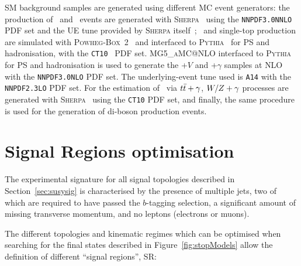 			\ac{SM} background samples are generated using different \ac{MC} event generators: the production of \Zjets\ and \Wjets\ events are generated with \textsc{Sherpa}~\cite{Sherpa} using the \verb+NNPDF3.0NNLO+~\cite{PDFs} \ac{PDF} set and the \ac{UE} tune provided by \textsc{Sherpa} itself~\cite{Sherpa}; \ttbar\ and single-top production are simulated with \textsc{Powheg-Box}~2~\cite{powheg-box} and interfaced to \textsc{Pythia}~\cite{Pythia2006} for \ac{PS} and hadronisation, with the \verb+CT10+~\cite{CT10} \ac{PDF} set. {\scshape MG5\_aMC\/@NLO} interfaced to \textsc{Pythia} for \ac{PS} and hadronisation is used to generate the \ttbar+$V$ and \ttbar+$\gamma$ samples at \ac{NLO} with the \verb+NNPDF3.0NLO+ \ac{PDF} set. The underlying-event tune used is \verb+A14+ with the \verb+NNPDF2.3LO+ \ac{PDF} set. For the estimation of \ttZ\ via $t\bar{t}+\gamma$, $W/Z+\gamma$ processes are generated with \textsc{Sherpa}~\cite{Sherpa} using the \verb+CT10+ \ac{PDF} set, and finally, the same procedure is used for the generation of di-boson production events.


	\section{Signal Regions optimisation}
	\label{sec:SRs}

		The experimental signature for all signal topologies described in Section~\ref{sec:susysig} is characterised by the presence of multiple jets, two of which are required to have passed the $b$-tagging selection, a significant amount of missing transverse momentum, and no leptons (electrons or muons).

		The different topologies and kinematic regimes which can be optimised when searching for the final states described in Figure~\ref{fig:stopModels} allow the definition of different ``signal regions'', \ac{SR}: 
		
